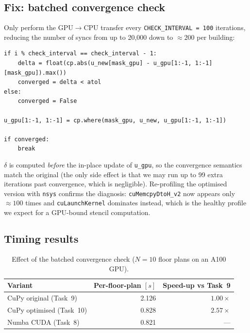 \documentclass[11pt,a4paper]{article}
\begin{document}
\subsection*{Fix: batched convergence check}

Only perform the GPU\(\rightarrow\)CPU transfer every
\texttt{CHECK\_INTERVAL = 100} iterations, reducing the number of syncs from
up to 20{,}000 down to \(\approx 200\) per building:

\begin{lstlisting}
if i % check_interval == check_interval - 1:
    delta = float(cp.abs(u_new[mask_gpu] - u_gpu[1:-1, 1:-1][mask_gpu]).max())
    converged = delta < atol
else:
    converged = False

u_gpu[1:-1, 1:-1] = cp.where(mask_gpu, u_new, u_gpu[1:-1, 1:-1])

if converged:
    break
\end{lstlisting}

\(\delta\) is computed \emph{before} the in-place update of \texttt{u\_gpu}, so
the convergence semantics match the original (the only side effect is that we
may run up to 99 extra iterations past convergence, which is negligible).
Re-profiling the optimised version with \texttt{nsys} confirms the diagnosis:
\texttt{cuMemcpyDtoH\_v2} now appears only \(\approx 100\) times and
\texttt{cuLaunchKernel} dominates instead, which is the healthy profile we
expect for a GPU-bound stencil computation.

\subsection*{Timing results}

\begin{table}[H]
    \centering
    \begin{tabular}{lrr}
        \toprule
        Variant                   & Per-floor-plan \([s]\) & Speed-up vs Task~9 \\
        \midrule
        CuPy original (Task~9)    & 2.126 & \(1.00\times\) \\
        CuPy optimised (Task~10)  & 0.828 & \(\mathbf{2.57\times}\) \\
        Numba CUDA (Task~8)       & 0.821 & --- \\
        \bottomrule
    \end{tabular}
    \caption{Effect of the batched convergence check (\(N = 10\) floor plans
    on an A100 GPU).}
    \label{tab:task10-timing}
\end{table}
\end{document}
